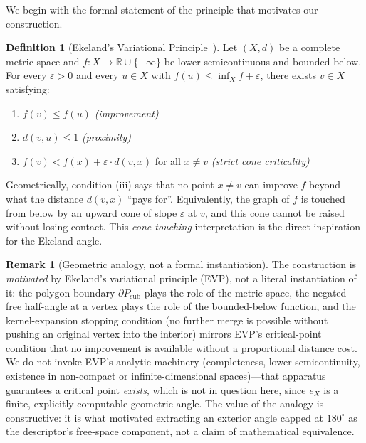 \documentclass[10pt]{article}
\theoremstyle{plain}
\theoremstyle{definition}
\newtheorem{definition}[theorem]{Definition}
\newtheorem{remark}[theorem]{Remark}
\begin{document}
We begin with the formal statement of the principle that motivates our
construction.

\begin{definition}[Ekeland's Variational Principle~\cite{ekeland1974}]
\label{def:ekeland}
Let $(X,d)$ be a complete metric space and
$f: X \to \mathbb{R} \cup \{+\infty\}$ be lower-semicontinuous and bounded
below.
For every $\varepsilon > 0$ and every $u \in X$ with
$f(u) \le \inf_X f + \varepsilon$, there exists $v \in X$ satisfying:
\begin{enumerate}[label=(\roman*)]
  \item $f(v) \le f(u)$ \hfill\emph{(improvement)}
  \item $d(v,u) \le 1$ \hfill\emph{(proximity)}
  \item $f(v) < f(x) + \varepsilon \cdot d(v,x)$ \;for all $x \ne v$
        \hfill\emph{(strict cone criticality)}
\end{enumerate}
\end{definition}

Geometrically, condition (iii) says that no point $x \ne v$ can improve
$f$ beyond what the distance $d(v,x)$ ``pays for''.
Equivalently, the graph of $f$ is touched from below by an upward cone
of slope $\varepsilon$ at $v$, and this cone cannot be raised without
losing contact.
This \emph{cone-touching} interpretation is the direct inspiration for the
Ekeland angle.

\begin{remark}[Geometric analogy, not a formal instantiation]
\label{rem:ekeland_analogy}
The construction is \emph{motivated} by Ekeland's variational principle
(EVP), not a literal instantiation of it: the polygon boundary
$\partial P_{\mathrm{sub}}$ plays the role of the metric space, the negated
free half-angle at a vertex plays the role of the bounded-below function, and
the kernel-expansion stopping condition (no further merge is possible without
pushing an original vertex into the interior) mirrors EVP's critical-point
condition that no improvement is available without a proportional distance
cost. We do not invoke EVP's analytic machinery (completeness,
lower semicontinuity, existence in non-compact or infinite-dimensional
spaces)---that apparatus guarantees a critical point \emph{exists}, which is
not in question here, since $e_X$ is a finite, explicitly computable
geometric angle. The value of the analogy is constructive: it is what
motivated extracting an exterior angle capped at $180^\circ$ as the
descriptor's free-space component, not a claim of mathematical equivalence.
\end{remark}
\end{document}

